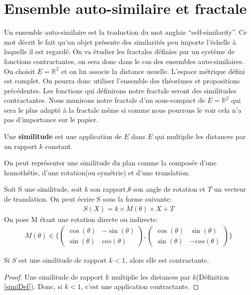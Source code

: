 \documentclass[a4paper, 12pt]{report}
\begin{document}
		\section{Ensemble auto-similaire et fractale}
		\label{FracEns}
			Un ensemble auto-similaire est la traduction du mot anglais ``self-similarity''. Ce mot décrit le fait qu'un objet présente des similarités peu importe l'échelle à laquelle il est regardé. On va étudier les fractales définies par un système de fonctions contractantes, on sera donc dans le cas des ensembles auto-similaires. On choisit $E=\mathds{R}^2$ et on lui associe la distance usuelle. L'espace métrique défini est complet. On pourra donc utiliser l'ensemble des théorèmes et propositions précédentes. Les fonctions qui définirons notre fractale seront des similitudes contractantes. Nous munirons notre fractale d'un sous-compact de $E=\mathds{R}^2$ qui sera le plus adapté à la fractale même si comme nous pourrons le voir cela n'a pas d'importance sur le papier. 
			\begin{definition}
			\label{simiDef}
				Une \textbf{similitude} est une application de $E$ dans $E$ qui multiplie les distances par un rapport $k$ constant.
			\end{definition}
			\begin{remark*}
				On peut représenter une similitude du plan comme la composée d'une homothétie, d'une rotation(ou symétrie) et d'une translation.
			\end{remark*}
			\begin{prop}
				Soit S une similitude, soit $k$ son rapport,$\theta$ son angle de rotation et $T$ un vecteur de translation. On peut écrire S sous la forme suivante:
				\begin{align*}
					S(X)=k\times M(\theta)\times X+T
				\end{align*}
				On pose M étant une rotation directe ou indirecte:
				\begin{align*}
					M(\theta)\in\Bigg\{
					\begin{pmatrix}
						\cos(\theta) & -\sin(\theta) \\
						\sin(\theta) & cos(\theta) 
					\end{pmatrix}
					,
					\begin{pmatrix}
						\cos(\theta) & \sin(\theta) \\
						\sin(\theta) & -cos(\theta) 
					\end{pmatrix}
					\Bigg\}
				\end{align*}
			\end{prop}
			\begin{prop}
				
				Si $S$ est une similitude de rapport $k<1$, alors elle est contractante.
			\end{prop}
			\begin{proof}
				Une similitude de rapport $k$ multiplie les distances par $k$(Définition \ref{simiDef}). Donc, si $k<1$, c'est une application contractante.
			\end{proof}
\end{document}

